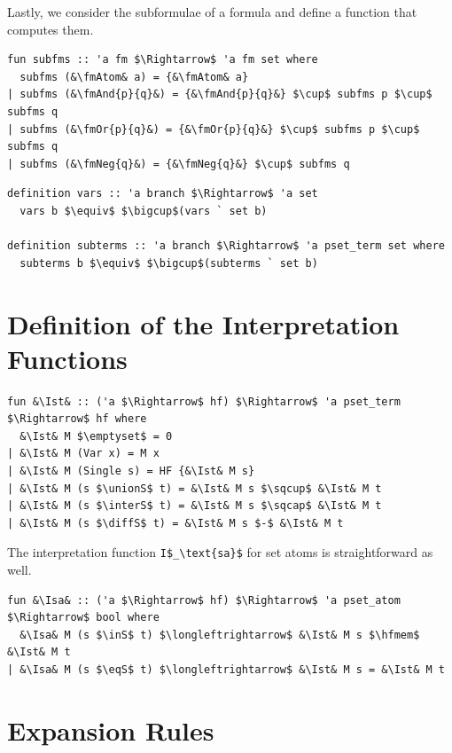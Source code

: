 \documentclass[runningheads]{llncs}
\newcommand{\unionS}{\sqcup_\text{s}}
\newcommand{\interS}{\sqcap_\text{s}}
\newcommand{\diffS}{-_\text{s}}
\newcommand{\inS}{\in_\text{s}}
\newcommand{\eqS}{=_\text{s}}
\newcommand{\Ist}{I$_\text{st}$}
\newcommand{\Isa}{I$_\text{sa}$}
\newcommand{\hfmem}{\boldsymbol{\in}}
\newcommand{\fmAndSymbol}{\boldsymbol{\land}}
\newcommand{\fmAnd}[2]{#1 $\fmAndSymbol$ #2}
\newcommand{\fmOr}[2]{#1 $\boldsymbol{\lor}$ #2}
\newcommand{\fmNegSymbol}{\boldsymbol{\neg}}
\newcommand{\fmNeg}[1]{$\fmNegSymbol\:$#1}
\newcommand{\fmAtom}{\textbf{A}}
\begin{document}
Lastly, we consider the subformulae of a formula and define a function that computes them.
\begin{lstlisting}
fun subfms :: 'a fm $\Rightarrow$ 'a fm set where
  subfms (&\fmAtom& a) = {&\fmAtom& a}
| subfms (&\fmAnd{p}{q}&) = {&\fmAnd{p}{q}&} $\cup$ subfms p $\cup$ subfms q
| subfms (&\fmOr{p}{q}&) = {&\fmOr{p}{q}&} $\cup$ subfms p $\cup$ subfms q
| subfms (&\fmNeg{q}&) = {&\fmNeg{q}&} $\cup$ subfms q
\end{lstlisting}

\begin{lstlisting}
definition vars :: 'a branch $\Rightarrow$ 'a set 
  vars b $\equiv$ $\bigcup$(vars ` set b)

definition subterms :: 'a branch $\Rightarrow$ 'a pset_term set where
  subterms b $\equiv$ $\bigcup$(subterms ` set b)
\end{lstlisting}

\section{Definition of the Interpretation Functions}

\begin{lstlisting}
fun &\Ist& :: ('a $\Rightarrow$ hf) $\Rightarrow$ 'a pset_term $\Rightarrow$ hf where
  &\Ist& M $\emptyset$ = 0
| &\Ist& M (Var x) = M x
| &\Ist& M (Single s) = HF {&\Ist& M s}
| &\Ist& M (s $\unionS$ t) = &\Ist& M s $\sqcup$ &\Ist& M t 
| &\Ist& M (s $\interS$ t) = &\Ist& M s $\sqcap$ &\Ist& M t 
| &\Ist& M (s $\diffS$ t) = &\Ist& M s $-$ &\Ist& M t 
\end{lstlisting}
The interpretation function \lstinline!I$_\text{sa}$! for set atoms is straightforward as well.
\begin{lstlisting}
fun &\Isa& :: ('a $\Rightarrow$ hf) $\Rightarrow$ 'a pset_atom $\Rightarrow$ bool where
  &\Isa& M (s $\inS$ t) $\longleftrightarrow$ &\Ist& M s $\hfmem$ &\Ist& M t
| &\Isa& M (s $\eqS$ t) $\longleftrightarrow$ &\Ist& M s = &\Ist& M t
\end{lstlisting}

\section{Expansion Rules}
\end{document}
